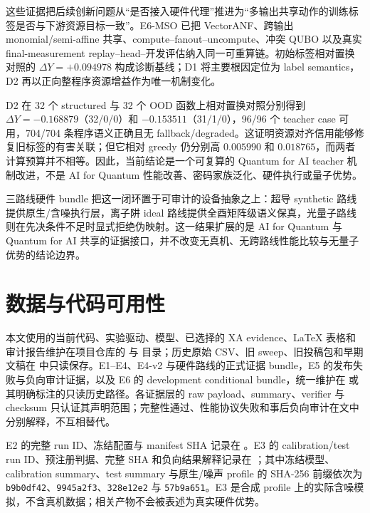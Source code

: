 \documentclass[UTF8,fontset=fandol,11pt]{ctexart}
\begin{document}
这些证据把后续创新问题从“是否接入硬件代理”推进为“多输出共享动作的训练标签是否与下游资源目标一致”。E6-MSO 已把 VectorANF、跨输出 monomial/semi-affine 共享、compute--fanout--uncompute、冲突 QUBO 以及真实 final-measurement replay--head--开发评估纳入同一可重算链。初始标签相对置换对照的 $\Delta Y=+0.094978$ 构成诊断基线；D1 将主要根因定位为 label semantics，D2 再以正向整程序资源增益作为唯一机制变化。

D2 在 32 个 structured 与 32 个 OOD 函数上相对置换对照分别得到 $\Delta Y=-0.168879$（32/0/0）和 $-0.153511$（31/1/0），96/96 个 teacher case 可用，704/704 条程序语义正确且无 fallback/degraded。这证明资源对齐信用能够修复旧标签的有害关联；但它相对 greedy 仍分别高 $0.005990$ 和 $0.018765$，而两者计算预算并不相等。因此，当前结论是一个可复算的 Quantum for AI teacher 机制改进，不是 AI for Quantum 性能改善、密码家族泛化、硬件执行或量子优势。

三路线硬件 bundle 把这一闭环置于可审计的设备抽象之上：超导 synthetic 路线提供原生/含噪执行层，离子阱 ideal 路线提供全酉矩阵级语义保真，光量子路线则在先决条件不足时显式拒绝伪映射。这一结果扩展的是 AI for Quantum 与 Quantum for AI 共享的证据接口，并不改变无真机、无跨路线性能比较与无量子优势的结论边界。

\section*{数据与代码可用性}

本文使用的当前代码、实验驱动、模型、已选择的 XA evidence、LaTeX 表格和审计报告维护在项目仓库的  与  目录；历史原始 CSV、旧 sweep、旧投稿包和早期文稿在  中只读保存。E1--E4、E4-v2 与硬件路线的正式证据 bundle，E5 的发布失败与负向审计证据，以及 E6 的 development conditional bundle，统一维护在  或其明确标注的只读历史路径。各证据层的 raw payload、summary、verifier 与 checksum 只认证其声明范围；完整性通过、性能协议失败和事后负向审计在文中分别解释，不互相替代。

E2 的完整 run ID、冻结配置与 manifest SHA 记录在 。E3 的 calibration/test run ID、预注册判据、完整 SHA 和负向结果解释记录在 ；其中冻结模型、calibration summary、test summary 与原生/噪声 profile 的 SHA-256 前缀依次为 \texttt{b9b0df42}、\texttt{9945a2f3}、\texttt{328e12e2} 与 \texttt{57b9a651}。E3 是合成 profile 上的实际含噪模拟，不含真机数据；相关产物不会被表述为真实硬件优势。
\end{document}
